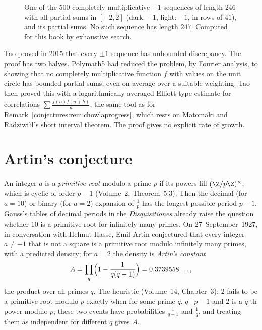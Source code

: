 \begin{figure}[ht]
\centering
{}
\caption{One of the $500$ completely multiplicative $\pm1$ sequences of length $246$ with all partial sums in $[-2,2]$ (dark: $+1$, light: $-1$, in rows of
$41$), and its partial sums. No such sequence has length $247$. Computed for this book by exhaustive search.}
\label{conjectures:fig:mult}
\end{figure}

\begin{remark}\label{conjectures:rem:taoedp}
Tao proved in 2015 that every $\pm1$ sequence has unbounded discrepancy. The proof has two halves. Polymath5 had reduced the problem, by Fourier analysis, to
showing that no completely multiplicative function $f$ with values on the unit circle has bounded partial sums, even on average over a suitable weighting.
Tao then proved this with a logarithmically averaged Elliott-type estimate for correlations $\sum\frac{f(n)\overline{f(n+h)}}n$, the same tool as for
Remark~\ref{conjectures:rem:chowlaprogress}, which rests on Matom\"aki and Radziwi\l\l's short interval theorem. The proof gives no explicit rate of growth.
\end{remark}

\section{Artin's conjecture}

An integer $a$ is a \emph{primitive root} modulo a prime $p$ if its powers fill $(\Z/p\Z)^\times$, which is cyclic of order $p-1$ (Volume~2, Theorem~5.3). Then the
decimal (for $a=10$) or binary (for $a=2$) expansion of $\frac1p$ has the longest possible period $p-1$. Gauss's tables of decimal periods in the
\emph{Disquisitiones} already raise the question whether $10$ is a primitive root for infinitely many primes. On 27~September~1927, in conversation with Helmut Hasse, Emil Artin conjectured that every integer $a\ne-1$ that is
not a square is a primitive root modulo infinitely many primes, with a predicted density; for $a=2$ the density is \emph{Artin's constant}
\[
A=\prod_q\Bigl(1-\frac1{q(q-1)}\Bigr)=0.3739558\ldots,
\]
the product over all primes $q$. The heuristic (Volume~14, Chapter~3): $2$ fails to be a primitive root modulo $p$ exactly when for some prime $q$, $q\mid p-1$ and $2$
is a $q$-th power modulo $p$; these two events have probabilities $\frac1{q-1}$ and $\frac1q$, and treating them as independent for different $q$ gives $A$.

